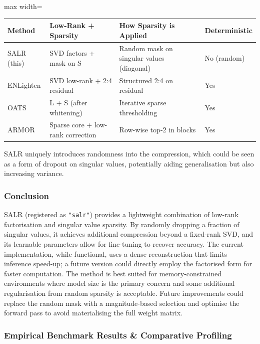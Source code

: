 \begin{center}
\begin{adjustbox}{max width=\columnwidth}
\renewcommand{\arraystretch}{1.2}
\begin{tabular}{llll}
\toprule
Method & Low-Rank + Sparsity & How Sparsity is Applied & Deterministic \\
\midrule
SALR (this) & SVD factors + mask on S & Random mask on singular values (diagonal) & No (random) \\
ENLighten & SVD low-rank + 2:4 residual & Structured 2:4 on residual & Yes \\
OATS & L + S (after whitening) & Iterative sparse thresholding & Yes \\
ARMOR & Sparse core + low-rank correction & Row-wise top-2 in blocks & Yes \\

\bottomrule
\end{tabular}
\end{adjustbox}
\end{center}
SALR uniquely introduces randomness into the compression, which could be seen as a form of dropout on singular values, potentially aiding generalisation but also increasing variance.


\subsubsection*{Conclusion}

SALR (registered as \texttt{"salr"}) provides a lightweight combination of low-rank factorisation and singular value sparsity. By randomly dropping a fraction of singular values, it achieves additional compression beyond a fixed-rank SVD, and its learnable parameters allow for fine-tuning to recover accuracy. The current implementation, while functional, uses a dense reconstruction that limits inference speed-up; a future version could directly employ the factorised form for faster computation. The method is best suited for memory-constrained environments where model size is the primary concern and some additional regularisation from random sparsity is acceptable. Future improvements could replace the random mask with a magnitude-based selection and optimise the forward pass to avoid materialising the full weight matrix.

\subsubsection*{Empirical Benchmark Results \& Comparative Profiling}

